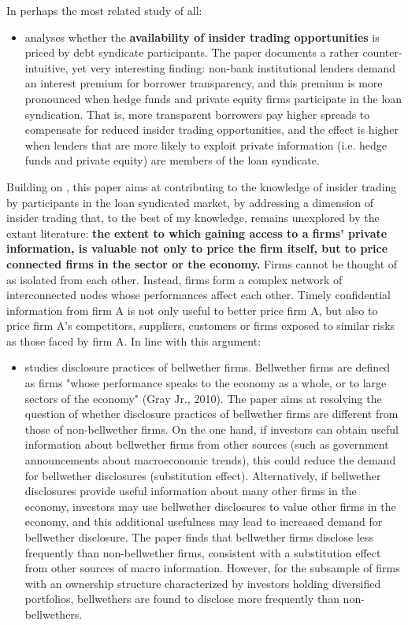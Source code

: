 \documentclass[english, 1p]{elsarticle}
\begin{document}
In perhaps the most related study of all:
\begin{itemize}
	\item \cite{Bushman2014} analyses whether the \textbf{availability of insider trading opportunities} is priced by debt syndicate participants. The paper documents a rather counter-intuitive, yet very interesting finding: non-bank institutional lenders demand an interest premium for borrower transparency, and this premium is more pronounced when hedge funds and private equity firms participate in the loan syndication. That is, more transparent borrowers pay higher spreads to compensate for reduced insider trading opportunities, and the effect is higher when lenders that are more likely to exploit private information (i.e. hedge funds and private equity) are members of the loan syndicate. 
\end{itemize}
 

Building on \cite{Bushman2014}, this paper aims at contributing to the knowledge of insider trading by participants in the loan syndicated market, by addressing a dimension of insider trading that, to the best of my knowledge, remains unexplored by the extant literature: \textbf{the extent to which gaining access to a firms' private information, is valuable not only to price the firm itself, but to price connected firms in the sector or the economy.} 
Firms cannot be thought of as isolated from each other. Instead, firms form a complex network of interconnected nodes whose performances affect each other. Timely confidential information from firm A is not only useful to better price firm A, but also to price firm A's competitors, suppliers, customers or firms exposed to similar risks as those faced by firm A. In line with this argument:

\begin{itemize}
 \item \citep{Tseng2014w} studies disclosure practices of bellwether firms. Bellwether firms are defined as firms "whose performance speaks to the economy as a whole, or to large sectors of the economy" (Gray Jr., 2010). The paper aims at resolving the question of whether disclosure practices of bellwether firms are different from those of non-bellwether firms. On the one hand, if investors can obtain useful information about bellwether firms from other sources (such as government announcements about macroeconomic trends), this could reduce the demand for bellwether disclosures (substitution effect). Alternatively, if bellwether disclosures provide useful information about many other firms in the economy, investors may use bellwether disclosures to value other firms in the economy, and this additional usefulness may lead to increased demand for bellwether disclosure. The paper finds that bellwether firms disclose less frequently than non-bellwether firms, consistent with a substitution effect from other sources of macro information. However, for the subsample of firms with an ownership structure characterized by investors holding diversified portfolios, bellwethers are found to disclose more frequently than non-bellwethers. 
\end{itemize}
\end{document}
